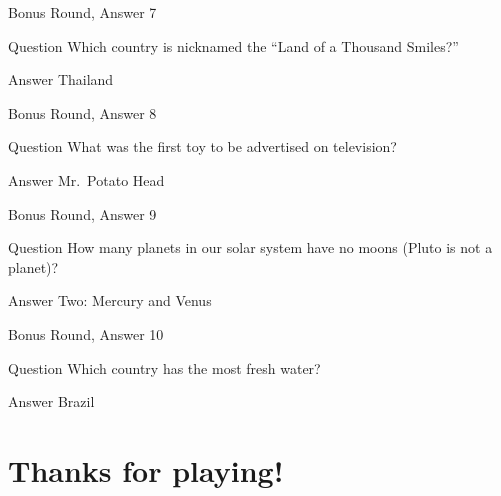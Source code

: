 \documentclass[11pt]{beamer}
\begin{document}
\begin{frame}{Bonus Round, Answer 7}
\begin{block}{Question}
Which country is nicknamed the ``Land of a Thousand Smiles?''
\end{block}
\pause{}
\begin{block}{Answer}
Thailand
\end{block}
\end{frame}
    

\begin{frame}{Bonus Round, Answer 8}
\begin{block}{Question}
What was the first toy to be advertised on television\@?
\end{block}
\pause{}
\begin{block}{Answer}
Mr.\ Potato Head
\end{block}
\end{frame}
    

\begin{frame}{Bonus Round, Answer 9}
\begin{block}{Question}
How many planets in our solar system have no moons (Pluto is not a planet)\@?
\end{block}
\pause{}
\begin{block}{Answer}
Two: Mercury and Venus
\end{block}
\end{frame}
    

\begin{frame}{Bonus Round, Answer 10}
\begin{block}{Question}
Which country has the most fresh water\@?
\end{block}
\pause{}
\begin{block}{Answer}
Brazil
\end{block}
\end{frame}
    

\begingroup{}
\section{Thanks for playing!}
\subsection{\ }
\endgroup{}
\end{document}
